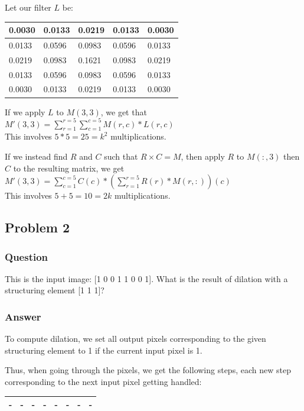 \documentclass[12pt]{article}
\begin{document}
\noindent
Let our filter $L$ be:
\begin{table}[h!]
\begin{tabular}{|l|l|l|l|l|}
\hline
0.0030 & 0.0133 & 0.0219 & 0.0133 & 0.0030 \\ \hline
0.0133 & 0.0596 & 0.0983 & 0.0596 & 0.0133 \\ \hline
0.0219 & 0.0983 & 0.1621 & 0.0983 & 0.0219 \\ \hline
0.0133 & 0.0596 & 0.0983 & 0.0596 & 0.0133 \\ \hline
0.0030 & 0.0133 & 0.0219 & 0.0133 & 0.0030 \\ \hline
\end{tabular}
\end{table}

\noindent
If we apply $L$ to $M(3,3)$, we get that $M'(3,3) = \sum_{r=1}^{r=5} \sum_{c=1}^{c=5} M(r,c) * L(r,c)$ \\
This involves $5 * 5 = 25 = k^2$ multiplications.

\noindent
If we instead find $R$ and $C$ such that $R \times C = M$, then apply $R$ to $M(:,3)$ then $C$ to the resulting matrix, we get $M'(3,3) = \sum_{c=1}^{c=5} C(c) * (\sum_{r=1}^{r=5} R(r) * M(r,:))(c)$ \\
This involves $5 + 5 = 10 = 2k$ multiplications.

\newpage
\subsection*{Problem 2}
\subsubsection*{Question}
This is the input image: [1 0 0 1 1 0 0 1]. What is the result of dilation with a structuring
element [1 1 1]?

\subsubsection*{Answer}
To compute dilation, we set all output pixels corresponding to the given structuring element to 1 if the current input pixel is 1.

Thus, when going through the pixels, we get the following steps, each new step corresponding to the next input pixel getting handled:

\begin{table}[h!]
\begin{tabular}{|l|l|l|l|l|l|l|l|}
\hline
- & - & - & - & - & - & - & - \\ \hline
\end{tabular}
\end{table}
\end{document}
